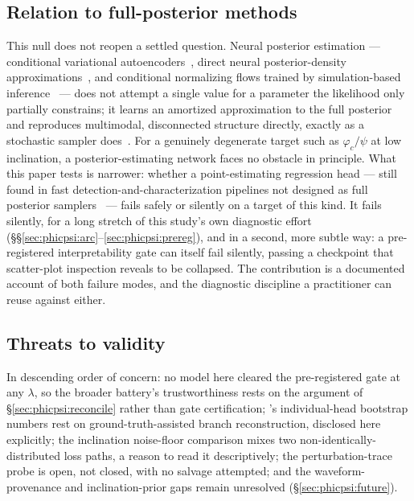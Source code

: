 \subsection{Relation to full-posterior methods}
\label{sec:phicpsi:npe}

This null does not reopen a settled question.
Neural posterior estimation --- conditional variational autoencoders~\citep{gabbard2022vitamin}, direct neural posterior-density approximations~\citep{chua2020learning,green2020complete}, and conditional normalizing flows trained by simulation-based inference~\citep{papamakarios2021normalizing,cranmer2020frontier,dax2021dingo,dax2023dingois} --- does not attempt a single value for a parameter the likelihood only partially constrains; it learns an amortized approximation to the full posterior and reproduces multimodal, disconnected structure directly, exactly as a stochastic sampler does~\citep{veitch2015lalinference,ashton2019bilby}.
For a genuinely degenerate target such as $\varphi_c/\psi$ at low inclination, a posterior-estimating network faces no obstacle in principle.
What this paper tests is narrower: whether a point-estimating regression head --- still found in fast detection-and-characterization pipelines not designed as full posterior samplers~\citep{george2018deep} --- fails safely or silently on a target of this kind.
It fails silently, for a long stretch of this study's own diagnostic effort (\S\S\ref{sec:phicpsi:arc}--\ref{sec:phicpsi:prereg}), and in a second, more subtle way: a pre-registered interpretability gate can itself fail silently, passing a checkpoint that scatter-plot inspection reveals to be collapsed.
The contribution is a documented account of both failure modes, and the diagnostic discipline a practitioner can reuse against either.

\subsection{Threats to validity}

In descending order of concern: no model here cleared the pre-registered gate at any $\lambda$, so the broader battery's trustworthiness rests on the argument of \S\ref{sec:phicpsi:reconcile} rather than gate certification; \pocB's individual-head bootstrap numbers rest on ground-truth-assisted branch reconstruction, disclosed here explicitly; the inclination noise-floor comparison mixes two non-identically-distributed loss paths, a reason to read it descriptively; the perturbation-trace probe is open, not closed, with no salvage attempted; and the waveform-provenance and inclination-prior gaps remain unresolved (\S\ref{sec:phicpsi:future}).

